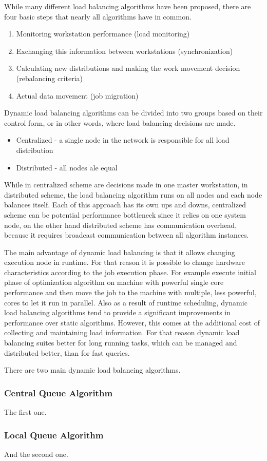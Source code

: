 While many different load balancing algorithms have been proposed, there are four basic steps that nearly all algorithms have in common\cite{malik2000dynamic}.
\begin{enumerate}
    \item Monitoring workstation performance (load monitoring)
    \item Exchanging this information between workstations (synchronization)
    \item Calculating new distributions and making the work movement decision (rebalancing criteria)
    \item Actual data movement (job migration)
\end{enumerate}
Dynamic load balancing algorithms can be divided into two groups based on their control form,
or in other words, where load balancing decisions are made\cite{malik2000dynamic}.
\begin{itemize}
    \item Centralized - a single node in the network is responsible for all load distribution
    \item Distributed - all nodes ale equal
\end{itemize}
While in centralized scheme are decisions made in one master workstation,
in distributed scheme, the load balancing algorithm runs on all nodes
and each node balances itself.
Each of this approach has its own ups and downs,
centralized scheme can be potential performance bottleneck
since it relies on one system node,
on the other hand distributed scheme has communication overhead,
because it requires broadcast communication between all algorithm instances.

The main advantage of dynamic load balancing is that it allows changing execution node in runtime.
For that reason it is possible to change hardware characteristics according to the job execution phase.
For example execute initial phase of optimization algorithm on machine with powerful single core performance
and then move the job to the machine with multiple, less powerful, cores to let it run in parallel.
Also as a result of runtime scheduling,
dynamic load balancing algorithms tend to provide a significant improvements in performance over static algorithms.
However, this comes at the additional cost of collecting and maintaining load information\cite{malik2000dynamic}.
For that reason dynamic load balancing suites better for long running tasks, which can be managed and distributed better, than for fast queries.

There are two main dynamic load balancing algorithms.

\subsubsection{Central Queue Algorithm}
The first one.

\subsubsection{Local Queue Algorithm}
And the second one.